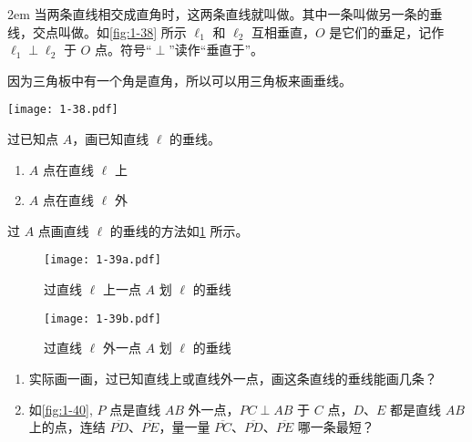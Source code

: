 \medskip\noindent
\begin{minipage}{0.65\linewidth}\parindent2em
当两条直线相交成直角时，这两条直线就叫做。其中一条叫做另一条的垂线，交点叫做。如\cref{fig:1-38} 所示 $\ell_1$ 和 $\ell_2$ 互相垂直，$O$ 是它们的垂足，记作 $\ell_1\perp \ell_2$ 于 $O$ 点。符号“$\perp$”读作“垂直于”。

因为三角板中有一个角是直角，所以可以用三角板来画垂线。
\end{minipage}%
\begin{minipage}{0.35\linewidth}\centering
\begin{figurehere}
  \texttt{[image: 1-38.pdf]}
	\caption{}\label{fig:1-38}
\end{figurehere}
\end{minipage}

\begin{example}
	过已知点 $A$，画已知直线 $\ell$ 的垂线。
\end{example}

\begin{solution}
\begin{enumerate}
	\item $A$ 点在直线 $\ell$ 上
	\item $A$ 点在直线 $\ell$ 外
\end{enumerate}
过 $A$ 点画直线 $\ell$ 的垂线的方法如\cref{fig:1-39} 所示。

\begin{figure}
	\begin{minipage}[b]{0.48\linewidth}
		\centering
		\texttt{[image: 1-39a.pdf]}
		\caption*{过直线 $\ell$ 上一点 $A$ 划 $\ell$ 的垂线}
	\end{minipage}
	\begin{minipage}[b]{0.48\linewidth}
		\centering
		\texttt{[image: 1-39b.pdf]}
		\caption*{过直线 $\ell$ 外一点 $A$ 划 $\ell$ 的垂线}
	\end{minipage}
	\caption{}\label{fig:1-39}
\end{figure}
\end{solution}

\begin{enumerate}[label=问题~\arabic*,leftmargin=1em,font=\bfseries]
	\item 实际画一画，过已知直线上或直线外一点，画这条直线的垂线能画几条？
	\item 如\cref{fig:1-40}, $P$ 点是直线 $AB$ 外一点，$PC\perp AB$ 于 $C$ 点，$D$、$E$ 都是直线 $AB$ 上的点，连结 $\overline{PD}$、$\overline{PE}$，量一量 $\overline{PC}$、$\overline{PD}$、$\overline{PE}$ 哪一条最短？
\end{enumerate}

